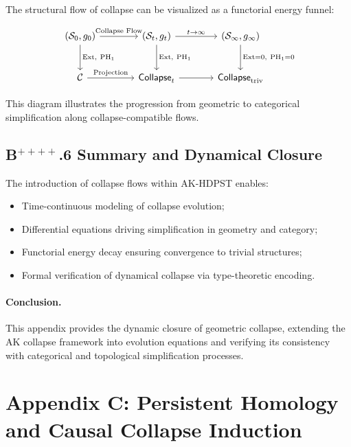 \documentclass[11pt]{article}
\begin{document}
The structural flow of collapse can be visualized as a functorial energy funnel:

\[
\begin{tikzcd}[row sep=large, column sep=large]
(\mathcal{S}_0, g_0)
  \arrow[r, "{\text{Collapse Flow}}"]
  \arrow[d, "{\text{Ext},\ \mathrm{PH}_1}"] &
(\mathcal{S}_t, g_t)
  \arrow[r, "{t \to \infty}"]
  \arrow[d, "{\text{Ext},\ \mathrm{PH}_1}"] &
(\mathcal{S}_\infty, g_\infty)
  \arrow[d, "{\text{Ext} = 0,\ \mathrm{PH}_1 = 0}"] \\
\mathcal{C}
  \arrow[r, "{\text{Projection}}"] &
\mathsf{Collapse}_t
  \arrow[r] &
\mathsf{Collapse}_{\mathrm{triv}}
\end{tikzcd}
\]


This diagram illustrates the progression from geometric to categorical simplification along collapse-compatible flows.

\subsection*{B$^{++++}$.6 Summary and Dynamical Closure}

The introduction of collapse flows within AK-HDPST enables:
\begin{itemize}
  \item Time-continuous modeling of collapse evolution;
  \item Differential equations driving simplification in geometry and category;
  \item Functorial energy decay ensuring convergence to trivial structures;
  \item Formal verification of dynamical collapse via type-theoretic encoding.
\end{itemize}

\paragraph{Conclusion.} This appendix provides the dynamic closure of geometric collapse, extending the AK collapse framework into evolution equations and verifying its consistency with categorical and topological simplification processes.



\section*{Appendix C: Persistent Homology and Causal Collapse Induction}
\end{document}
